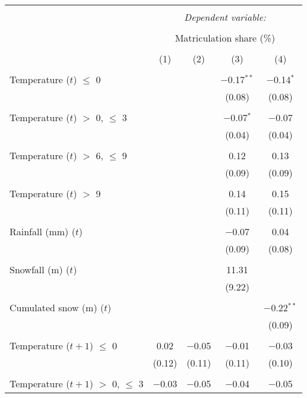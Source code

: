 
\begin{tabular}{@{\extracolsep{5pt}}lcccc} 
\\[-1.8ex]\hline 
\hline \\[-1.8ex] 
 & \multicolumn{4}{c}{\textit{Dependent variable:}} \\ 
\cline{2-5} 
\\[-1.8ex] & \multicolumn{4}{c}{Matriculation share (\%)} \\ 
\\[-1.8ex] & (1) & (2) & (3) & (4)\\ 
\hline \\[-1.8ex] 
 Temperature ($t$) $\le$ 0 &  &  & $-$0.17$^{**}$ & $-$0.14$^{*}$ \\ 
  &  &  & (0.08) & (0.08) \\ 
  & & & & \\ 
 Temperature ($t$) $>$ 0, $\le$ 3 &  &  & $-$0.07$^{*}$ & $-$0.07 \\ 
  &  &  & (0.04) & (0.04) \\ 
  & & & & \\ 
 Temperature ($t$) $>$ 6, $\le$ 9 &  &  & 0.12 & 0.13 \\ 
  &  &  & (0.09) & (0.09) \\ 
  & & & & \\ 
 Temperature ($t$) $>$ 9 &  &  & 0.14 & 0.15 \\ 
  &  &  & (0.11) & (0.11) \\ 
  & & & & \\ 
 Rainfall (mm) ($t$) &  &  & $-$0.07 & 0.04 \\ 
  &  &  & (0.09) & (0.08) \\ 
  & & & & \\ 
 Snowfall (m) ($t$) &  &  & 11.31 &  \\ 
  &  &  & (9.22) &  \\ 
  & & & & \\ 
 Cumulated snow (m) ($t$) &  &  &  & $-$0.22$^{**}$ \\ 
  &  &  &  & (0.09) \\ 
  & & & & \\ 
 Temperature ($t + 1$) $\le$ 0 & 0.02 & $-$0.05 & $-$0.01 & $-$0.03 \\ 
  & (0.12) & (0.11) & (0.11) & (0.10) \\ 
  & & & & \\ 
 Temperature ($t + 1$) $>$ 0, $\le$ 3 & $-$0.03 & $-$0.05 & $-$0.04 & $-$0.05 \\ 

\end{tabular}

